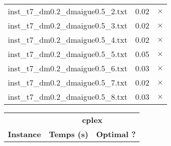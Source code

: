 \documentclass{article}
\begin{document}
\begin{center}
\begin{tabular}{lrr}
inst\_t7\_dm0.2\_dmaigue0.5\_2.txt & 0.02 & 
$\times$
\\
inst\_t7\_dm0.2\_dmaigue0.5\_3.txt & 0.02 & 
$\times$
\\
inst\_t7\_dm0.2\_dmaigue0.5\_4.txt & 0.02 & 
$\times$
\\
inst\_t7\_dm0.2\_dmaigue0.5\_5.txt & 0.05 & 
$\times$
\\
inst\_t7\_dm0.2\_dmaigue0.5\_6.txt & 0.03 & 
$\times$
\\
inst\_t7\_dm0.2\_dmaigue0.5\_7.txt & 0.02 & 
$\times$
\\
inst\_t7\_dm0.2\_dmaigue0.5\_8.txt & 0.03 & 
$\times$
\\
\hline\end{tabular}
\end{center}

\newpage
\begin{center}
\renewcommand{\arraystretch}{1.4} 
 \begin{tabular}{lrr}
	\hline
 & \multicolumn{2}{c}{\textbf{cplex}}\\
\textbf{Instance}  & \textbf{Temps (s)} & \textbf{Optimal ?} \\\hline


\end{tabular}
\end{center}
\end{document}
